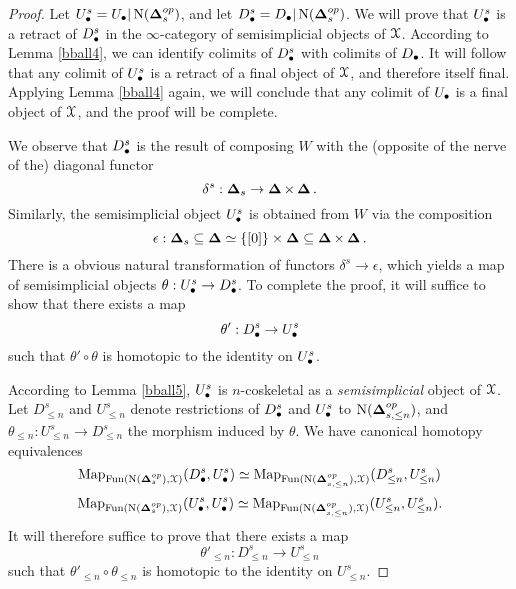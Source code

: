 \begin{proof}
Let $U_{\bullet}^{s} = U_{\bullet} | \operatorname{N}(\operatorname{{\bf \Delta}}_{s}^{op})$, and let
$D_{\bullet}^{s} = D_{\bullet} | \operatorname{N}(\operatorname{{\bf \Delta}}_{s}^{op})$. We will prove that
$U_{\bullet}^{s}$ is a retract of $D_{\bullet}^{s}$ in the $\infty$-category of semisimplicial
objects of $\operatorname{\mathcal{X}}$. According to Lemma \ref{bball4}, we can identify colimits of
$D_{\bullet}^{s}$ with colimits of $D_{\bullet}$. It will follow that any colimit of
$U_{\bullet}^{s}$ is a retract of a final object of $\operatorname{\mathcal{X}}$, and therefore itself final.
Applying Lemma \ref{bball4} again, we will conclude that any colimit of $U_{\bullet}$ is
a final object of $\operatorname{\mathcal{X}}$, and the proof will be complete.

We observe that $D^{s}_{\bullet}$ is the result of composing $W$ with the (opposite of the nerve of the) diagonal functor
$$\delta^{s}: \operatorname{{\bf \Delta}}_{s} \rightarrow \operatorname{{\bf \Delta}} \times \operatorname{{\bf \Delta}}.$$
Similarly, the semisimplicial object $U^{s}_{\bullet}$ is obtained from $W$ via the composition
$$ \epsilon: \operatorname{{\bf \Delta}}_{s} \subseteq \operatorname{{\bf \Delta}} \simeq \{ [0] \} \times \operatorname{{\bf \Delta}} \subseteq
\operatorname{{\bf \Delta}} \times \operatorname{{\bf \Delta}}.$$
There is a obvious natural transformation of functors $\delta^{s} \rightarrow \epsilon$, which
yields a map of semisimplicial objects $\theta: U^{s}_{\bullet} \rightarrow D^{s}_{\bullet}$.
To complete the proof, it will suffice to show that there exists a map
$$ \theta': D^{s}_{\bullet} \rightarrow U^{s}_{\bullet}$$
such that $\theta' \circ \theta$ is homotopic to the identity on $U^{s}_{\bullet}$.

According to Lemma \ref{bball5}, $U^{s}_{\bullet}$ is $n$-coskeletal as a {\em semisimplicial} object of $\operatorname{\mathcal{X}}$. Let $D^{s}_{\leq n}$ and $U^{s}_{\leq n}$ denote
restrictions of $D^{s}_{\bullet}$ and $U^{s}_{\bullet}$ to $\operatorname{N}(\operatorname{{\bf \Delta}}_{s, \leq n}^{op})$, and $\theta_{\leq n}:
U^{s}_{\leq n} \rightarrow D^{s}_{\leq n}$ the morphism induced by $\theta$.
We have canonical homotopy equivalences
$$\operatorname{{Map}}_{ \operatorname{Fun}(\operatorname{N}(\operatorname{{\bf \Delta}}^{op}_{s}), \operatorname{\mathcal{X}})} ( D^{s}_{\bullet}, U^{s}_{\bullet})
\simeq \operatorname{{Map}}_{ \operatorname{Fun}(\operatorname{N}(\operatorname{{\bf \Delta}}^{op}_{s, \leq n}),\operatorname{\mathcal{X}})}( D^{s}_{\leq n}, U^{s}_{\leq n})$$
$$\operatorname{{Map}}_{ \operatorname{Fun}(\operatorname{N}(\operatorname{{\bf \Delta}}^{op}_{s}),\operatorname{\mathcal{X}})} ( U^{s}_{\bullet}, U^{s}_{\bullet})
\simeq \operatorname{{Map}}_{ \operatorname{Fun}(\operatorname{N}(\operatorname{{\bf \Delta}}^{op}_{s, \leq n}),\operatorname{\mathcal{X}})}( U^{s}_{\leq n}, U^{s}_{\leq n}).$$
It will therefore suffice to prove that there exists a map
$$ \theta'_{\leq n}: D^{s}_{\leq n} \rightarrow U^{s}_{\leq n}$$
such that $\theta'_{\leq n} \circ \theta_{\leq n}$ is homotopic to the identity on $U^{s}_{\leq n}$.


\end{proof}
